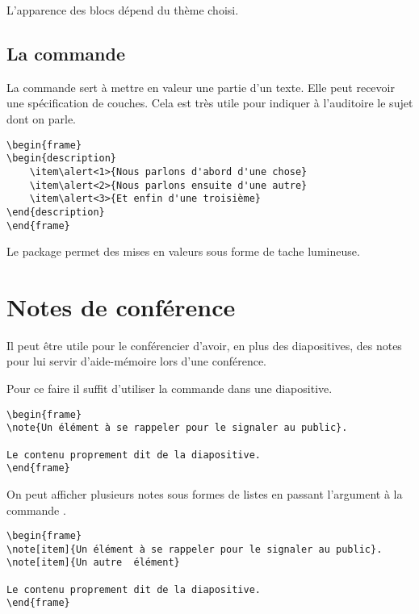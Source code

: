 L'apparence des blocs dépend du thème choisi.

\subsection{La commande }

La commande  sert à mettre en valeur une partie d'un texte. Elle peut recevoir une spécification de couches. Cela est très utile pour indiquer à l'auditoire le sujet dont on parle. 

\begin{verbatim}
\begin{frame}
\begin{description}
	\item\alert<1>{Nous parlons d'abord d'une chose}
	\item\alert<2>{Nous parlons ensuite d'une autre}
	\item\alert<3>{Et enfin d'une troisième}
\end{description}
\end{frame}
\end{verbatim}

\begin{anedocte}

Le package  permet des mises en valeurs sous forme de tache lumineuse.

\end{anedocte}
\section{Notes de conférence}

Il peut être utile pour le conférencier d'avoir, en plus des diapositives, des notes pour lui servir d'aide-mémoire lors d'une conférence.

Pour ce faire il suffit d'utiliser la commande  dans une diapositive.

\begin{verbatim}
\begin{frame}
\note{Un élément à se rappeler pour le signaler au public}.
	
Le contenu proprement dit de la diapositive.
\end{frame}
\end{verbatim}

On peut afficher plusieurs notes sous formes de listes en passant l'argument  à la commande .

\begin{verbatim}
\begin{frame}
\note[item]{Un élément à se rappeler pour le signaler au public}.
\note[item]{Un autre  élément}
	
Le contenu proprement dit de la diapositive.
\end{frame}
\end{verbatim}


